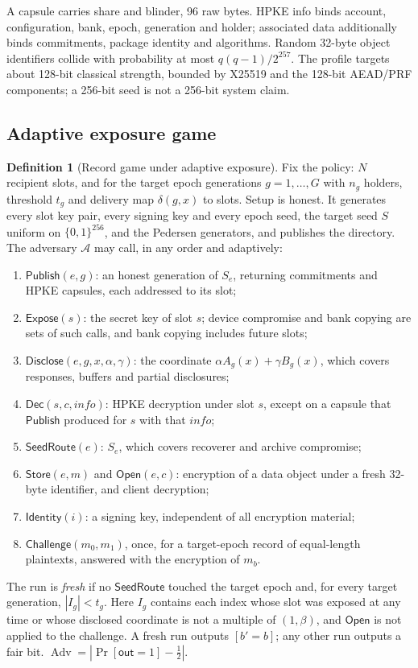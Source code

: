 \documentclass[pdflatex,sn-mathphys-num]{sn-jnl}
\theoremstyle{plain}
\theoremstyle{definition}
\newtheorem{definition}[theorem]{Definition}
\newcommand{\Adv}{\operatorname{Adv}}
\begin{document}
A capsule carries share and blinder, 96 raw bytes. HPKE info binds account, configuration, bank, epoch, generation and holder; associated data additionally binds commitments, package identity and algorithms. Random 32-byte object identifiers collide with probability at most $q(q-1)/2^{257}$. The profile targets about 128-bit classical strength, bounded by X25519 and the 128-bit AEAD/PRF components; a 256-bit seed is not a 256-bit system claim.

\subsection{Adaptive exposure game}\label{sec:adaptive}
\begin{definition}[Record game under adaptive exposure]\label{def:adaptivegame}
Fix the policy: $N$ recipient slots, and for the target epoch generations $g=1,\dots,G$ with $n_g$ holders, threshold $t_g$ and delivery map $\delta(g,x)$ to slots. Setup is honest. It generates every slot key pair, every signing key and every epoch seed, the target seed $S$ uniform on $\{0,1\}^{256}$, and the Pedersen generators, and publishes the directory. The adversary $\mathcal A$ may call, in any order and adaptively:
\begin{enumerate}
\item $\mathsf{Publish}(e,g)$: an honest generation of $S_e$, returning commitments and HPKE capsules, each addressed to its slot;
\item $\mathsf{Expose}(s)$: the secret key of slot $s$; device compromise and bank copying are sets of such calls, and bank copying includes future slots;
\item $\mathsf{Disclose}(e,g,x,\alpha,\gamma)$: the coordinate $\alpha A_g(x)+\gamma B_g(x)$, which covers responses, buffers and partial disclosures;
\item $\mathsf{Dec}(s,c,\mathit{info})$: HPKE decryption under slot $s$, except on a capsule that $\mathsf{Publish}$ produced for $s$ with that $\mathit{info}$;
\item $\mathsf{SeedRoute}(e)$: $S_e$, which covers recoverer and archive compromise;
\item $\mathsf{Store}(e,m)$ and $\mathsf{Open}(e,c)$: encryption of a data object under a fresh 32-byte identifier, and client decryption;
\item $\mathsf{Identity}(i)$: a signing key, independent of all encryption material;
\item $\mathsf{Challenge}(m_0,m_1)$, once, for a target-epoch record of equal-length plaintexts, answered with the encryption of $m_b$.
\end{enumerate}
The run is \emph{fresh} if no $\mathsf{SeedRoute}$ touched the target epoch and, for every target generation, $|I_g|<t_g$. Here $I_g$ contains each index whose slot was exposed at any time or whose disclosed coordinate is not a multiple of $(1,\beta)$, and $\mathsf{Open}$ is not applied to the challenge. A fresh run outputs $[b'=b]$; any other run outputs a fair bit. $\Adv=|\Pr[\mathsf{out}=1]-\tfrac12|$.
\end{definition}
\end{document}
